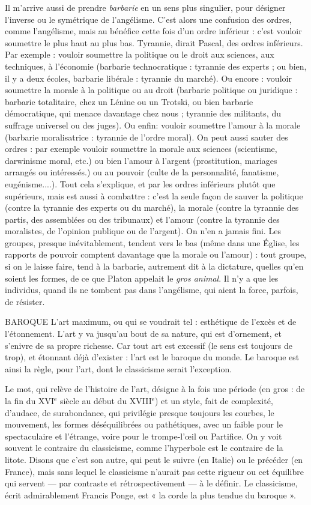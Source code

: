 Il m'arrive aussi de prendre {\it barbarie} en un sens plus singulier, pour désigner
l'inverse ou le symétrique de l’angélisme. C’est alors une confusion des ordres,
comme l’angélisme, mais au bénéfice cette fois d’un ordre inférieur : c’est vouloir
soumettre le plus haut au plus bas. Tyrannie, dirait Pascal, des ordres inférieurs.
Par exemple : vouloir soumettre la politique ou le droit aux sciences, aux techniques,
à l’économie (barbarie technocratique : tyrannie des experts ; ou bien, il y
a deux écoles, barbarie libérale : tyrannie du marché). Ou encore : vouloir soumettre
la morale à la politique ou au droit (barbarie politique ou juridique : barbarie
totalitaire, chez un Lénine ou un Trotski, ou bien barbarie démocratique,
qui menace davantage chez nous ; tyrannie des militants, du suffrage universel ou
des juges). Ou enfin: vouloir soumettre l'amour à la morale (barbarie
moralisatrice : tyrannie de l’ordre moral). On peut aussi sauter des ordres : par
exemple vouloir soumettre la morale aux sciences (scientisme, darwinisme moral,
etc.) ou bien l'amour à l'argent (prostitution, mariages arrangés ou intéressés.)
ou au pouvoir (culte de la personnalité, fanatisme, eugénisme....). Tout cela
s'explique, et par les ordres inférieurs plutôt que supérieurs, mais est aussi à
combattre : c’est la seule façon de sauver la politique (contre la tyrannie des
experts ou du marché), la morale (contre la tyrannie des partis, des assemblées ou
des tribunaux) et l’amour (contre la tyrannie des moralistes, de l'opinion
publique ou de l'argent). On n’en a jamais fini. Les groupes, presque inévitablement,
tendent vers le bas (même dans une Église, les rapports de pouvoir comptent
davantage que la morale ou l'amour) : tout groupe, si on le laisse faire, tend
à la barbarie, autrement dit à la dictature, quelles qu’en soient les formes, de ce
que Platon appelait le {\it gros animal}. Il n’y a que les individus, quand ils ne tombent
pas dans l’angélisme, qui aient la force, parfois, de résister.

BAROQUE L’art maximum, ou qui se voudrait tel : esthétique de l’excès et
de l’étonnement. L’art y va jusqu’au bout de sa nature, qui est
d'ornement, et s’enivre de sa propre richesse. Car tout art est excessif (le sens
est toujours de trop), et étonnant déjà d’exister : l’art est le baroque du monde.
Le baroque est ainsi la règle, pour l’art, dont le classicisme serait l'exception.

Le mot, qui relève de l’histoire de l’art, désigne à la fois une période (en gros :
de la fin du {\footnotesize XVI$^\text{e}$} siècle au début du {\footnotesize XVIII$^\text{e}$}) et un style, fait de complexité, d’audace,
de surabondance, qui privilégie presque toujours les courbes, le mouvement, les
formes déséquilibrées ou pathétiques, avec un faible pour le spectaculaire et
l'étrange, voire pour le trompe-l’œil ou Partifice. On y voit souvent le contraire
du classicisme, comme l’hyperbole est le contraire de la litote. Disons que c’est
son autre, qui peut le suivre (en Italie) ou le précéder (en France), mais sans
lequel le classicisme n’aurait pas cette rigueur ou cet équilibre qui servent — par
contraste et rétrospectivement — à le définir. Le classicisme, écrit admirablement
Francis Ponge, est « la corde la plus tendue du baroque ».

